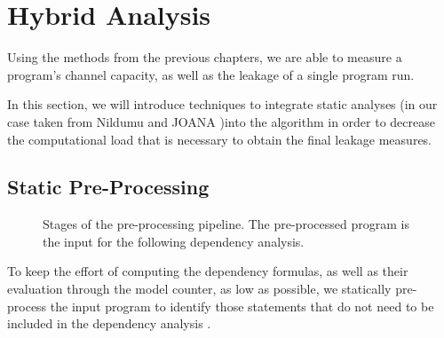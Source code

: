 \chapter{Hybrid Analysis}

Using the methods from the previous chapters, we are able to measure a program's channel capacity, as well as the leakage of a single program run.

In this section, we will introduce techniques to integrate static analyses (in our case taken from Nildumu \cite{bechberger18} and JOANA \cite{hammer09})into the algorithm in order to decrease the computational load that is necessary to obtain the final leakage measures.

\section{Static Pre-Processing}
\begin{figure}
    \centering
    \caption{Stages of the pre-processing pipeline. The pre-processed program is the input for the following dependency analysis.}
    \label{fig:pp}
\end{figure}

To keep the effort of computing the dependency formulas, as well as their evaluation through the model counter, as low as possible, we statically pre-process the input program to identify those statements that do not need to be included in the dependency analysis .

